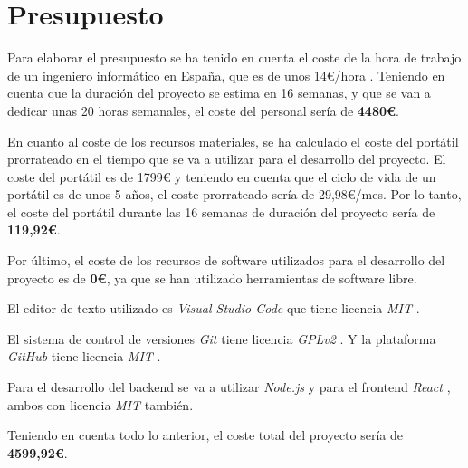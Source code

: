 \section{Presupuesto}
Para elaborar el presupuesto se ha tenido en cuenta el coste de la hora de trabajo
de un ingeniero informático en España, que es de unos 14€/hora \cite{coste-hora}.
Teniendo en cuenta que la duración del proyecto se estima en 16 semanas, y que
se van a dedicar unas 20 horas semanales, el coste del personal sería de \textbf{4480€}.

\vspace{1cm}

En cuanto al coste de los recursos materiales, se ha calculado el coste del portátil
prorrateado en el tiempo que se va a utilizar para el desarrollo del proyecto. El
coste del portátil es de 1799€ \cite{portatil} y teniendo en cuenta que el ciclo de vida de un
portátil es de unos 5 años, el coste prorrateado sería de 29,98€/mes. Por lo tanto,
el coste del portátil durante las 16 semanas de duración del proyecto sería de
\textbf{119,92€}.

\vspace{1cm}

Por último, el coste de los recursos de software utilizados para el desarrollo
del proyecto es de \textbf{0€}, ya que se han utilizado herramientas de software libre.

El editor de texto utilizado es \textit{Visual Studio Code} \cite{vscode} que tiene
licencia \textit{MIT} \cite{mit-license}.

El sistema de control de versiones \textit{Git} \cite{git} tiene licencia
\textit{GPLv2} \cite{gplv2}. Y la plataforma \textit{GitHub} \cite{github} tiene
licencia \textit{MIT} \cite{mit-license}.

Para el desarrollo del backend se va a utilizar \textit{Node.js} \cite{nodejs}
y para el frontend \textit{React} \cite{react}, ambos con licencia
\textit{MIT} \cite{mit-license} también.

\vspace{1cm}

Teniendo en cuenta todo lo anterior, el coste total del proyecto sería de
\textbf{4599,92€}.
